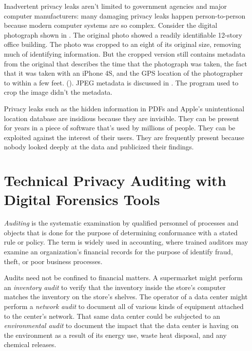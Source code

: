 Inadvertent privacy leaks aren't limited to government agencies and
major computer manufacturers: many damaging privacy leaks happen
person-to-person because modern computer systems are so
complex. Consider the digital photograph shown in . The
original photo showed a readily
identifiable 12-story office building. The photo was cropped to an
eight of its original size, removing much of identifying information. But the cropped
version still contains metadata from the original that
describes the time that the photograph was taken, the fact that it was
taken with an iPhone 4S, and the GPS location of the
photographer to within a few feet. (). JPEG
metadata is discussed in . The program used to crop
the image didn't the metadata.



Privacy leaks such as the hidden information in PDFs and Apple's
unintentional location database are insidious because they are
invisible. They can be present for years in a piece of software that's
used by millions of people. They can be exploited against the interest
of their users. They are frequently present because nobody looked
deeply at the data and publicized their findings. 


\section{Technical Privacy Auditing with Digital Forensics Tools}

\emph{Auditing} is the systematic examination by qualified personnel of processes and
objects that is done for the purpose of determining conformance with a
stated rule or policy. 
The term is widely used in accounting, where
trained auditors may examine an organization's financial records for
the purpose of identify fraud, theft, or poor business processes. 

Audits need not be confined to financial matters.  A supermarket might
perform an \emph{inventory audit} to verify that the inventory inside
the store's computer matches the inventory on the store's shelves. The
operator of a data center might perform a \emph{network audit} to document all of
various kinds of equipment attached to the center's network. That same
data center could be subjected to an \emph{environmental audit} to
document the impact that the data center is having on the environment
as a result of its energy use, waste heat disposal, and any chemical
releases. 

